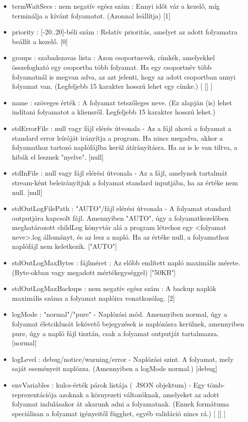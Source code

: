 \documentclass[12pt]{report}
\begin{document}
\begin{itemize}
  \item termWaitSecs : nem negatív egész szám : Ennyi időt vár a kezelő, míg terminálja a kívánt folyamatot. (Azonnal leállítja) [1]
  \item priority : [-20..20]-béli szám : Relatív prioritás, amelyet az adott folyamatra beállít a kezelő. [0]
  \item groups : szabadszavas lista : Azon csoportnevek, címkék, amelyekkel összefogható egy csoportba több folyamat. Ha egy csoportnév több folyamatnál is megvan adva, az azt jelenti, hogy az adott csoportban annyi folyamat van. (Legfeljebb 15 karakter hosszú lehet egy címke.) [ [] ]
  \item name : szöveges érték : A folyamat tetszőleges neve. (Ez alapján (is) lehet indítani folyamatot a kliensről. Legfeljebb 15 karakter hosszú lehet.)
  \item stdErrorFile : null vagy fájl elérés útvonala - Az a fájl ahová a folyamat a standard error leíróját irányítja a program. Ha nincs megadva, akkor a folyamathoz tartozó naplófájlba kerül átírányításra. Ha az is le van tiltva, a hibák el lesznek "nyelve". [null]
  \item stdInFile : null vagy fájl elérési útvonala - Az a fájl, amelynek tartalmát stream-ként beleirányítjuk a folyamat standard inputjába, ha az értéke nem null. [null]
  \item stdOutLogFilePath : "AUTO"/fájl elérési útvonala - A folyamat standard outputjára kapcsolt fájl. Amennyiben "AUTO", úgy a folyamatkezelőben meghatározott childLog könyvtár alá a program létrehoz egy <folyamat neve>.log állományt, és az lesz a napló. Ha az értéke null, a folyamathoz naplófájl nem keletkezik. ["AUTO"]
  \item stdOutLogMaxBytes : fájlméret : Az előbb említett napló maximális mérete. (Byte-okban vagy megadott mértékegységgel) ["50KB"]
  \item stdOutLogMaxBackups : nem negatív egész szám : A backup naplók maximális száma a folyamat naplóira vonatkozólag. [2]
  \item logMode : "normal"/"pure" - Naplózási mód. Amennyiben normal, úgy a folyamat életciklusát lekövető bejegyzések is naplózásra kerülnek, amennyiben pure, úgy a napló fájl tisztán, csak a folyamat outputját tartalmazza. [normal]
  \item logLevel : debug/notice/warning/error - Naplózási szint. A folyamat, mely saját eseményeit naplózza. (Amennyiben a logMode normal.) [debug]
  \item envVariables : kulcs-érték párok listája (~JSON objektum) - Egy tömb-reprezentációja azoknak a környezeti változóknak, amelyeket az adott folyamat indulásakor át akarunk adni a folyamatnak. (Ennek formátuma speciálisan a folyamat igényeitől függhet, egyéb validáció nincs rá.) [ [] ]
  \end{itemize} 
\end{document}
